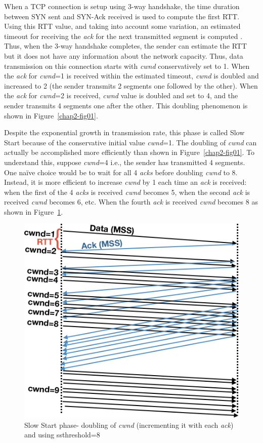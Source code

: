 \begin{multicols}{2}
When a TCP connection is setup using 3-way handshake, the time duration between SYN sent and SYN-Ack received is used to compute the first RTT. Using this RTT value, and taking into account some variation, an estimated timeout for receiving the \textit{ack} for the next transmitted segment is computed  \cite{art2-key03}. Thus, when the 3-way handshake completes, the sender can estimate the RTT but it does not have any information about the network capacity. Thus, data transmission on this connection starts with \textit{cwnd} conservatively set to 1. When the \textit{ack} for \textit{cwnd}=1 is received within the estimated timeout, \textit{cwnd} is doubled and increased to 2 (the sender transmits 2 segments one followed by the other). When the \textit{ack} for \textit{cwnd}=2 is received, \textit{cwnd} value is doubled and set to 4, and the sender transmits 4 segments one after the other. This doubling phenomenon is shown in Figure~\ref{chap2-fig01}.

Despite the exponential growth in transmission rate, this phase is called Slow Start because of the conservative initial value \textit{cwnd}=1. The doubling of \textit{cwnd} can actually be accomplished more efficiently than shown in Figure~\ref{chap2-fig01}. To understand this, suppose \textit{cwnd}=4 i.e., the sender has transmitted 4 segments. One naïve choice would be to wait for all 4 \textit{acks} before doubling \textit{cwnd} to 8. Instead, it is more efficient to increase \textit{cwnd} by 1 each time an \textit{ack} is received: when the first of the 4 \textit{acks} is received \textit{cwnd} becomes 5, when the second \textit{ack} is received \textit{cwnd} becomes 6, etc. When the fourth \textit{ack} is received \textit{cwnd} becomes 8 as shown in Figure~\ref{chap2-fig02}.
\begin{figure}[H]
\centering
\includegraphics[scale=2]{src/Figures/chap2/chap2-fig02.jpg}
\caption{Slow Start phase- doubling of \textit{cwnd} (incrementing it with each \textit{ack}) and using ssthreshold=8}\label{chap2-fig02}
\end{figure}


\end{multicols}

